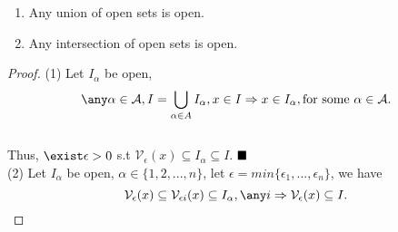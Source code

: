 \begin{theorem} \hspace{1em}
\begin{enumerate}
    \item Any union of open sets is open.
    \item Any  intersection of open sets is open.
\end{enumerate}
\end{theorem}
\begin{proof}
    (1) Let $I_\alpha$ be open, 
    \[
    \any \alpha \in \mathcal{A}, I = \bigcup\limits_{\alpha \in A} I_\alpha, x \in I \Rightarrow x \in I_\alpha, \text{for some } \alpha \in \mathcal{A}.
    \] \\
    Thus, $\exist \epsilon >0$ s.t $\mathcal{V}_\epsilon (x) \subseteq I_\alpha \subseteq I$. $\hfill\blacksquare$ \\
    (2) Let $I_\alpha$ be open, $\alpha \in \{1,2,...,n\}$, let $\epsilon = min\{ \epsilon_1,...,\epsilon_n\}$, we have 
    \[
    \mathcal{V}_\epsilon (x) \subseteq \mathcal{V}_{\epsilon i} (x)\subseteq I_\alpha, \any i \Rightarrow \mathcal{V}_\epsilon (x) \subseteq I.
    \]
\end{proof}

